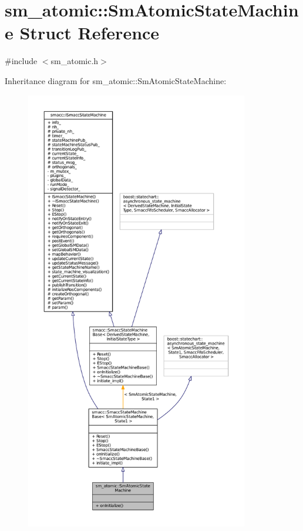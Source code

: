\hypertarget{structsm__atomic_1_1SmAtomicStateMachine}{}\section{sm\+\_\+atomic\+:\+:Sm\+Atomic\+State\+Machine Struct Reference}
\label{structsm__atomic_1_1SmAtomicStateMachine}


{\ttfamily \#include $<$sm\+\_\+atomic.\+h$>$}



Inheritance diagram for sm\+\_\+atomic\+:\+:Sm\+Atomic\+State\+Machine\+:
\nopagebreak
\begin{figure}[H]
\begin{center}
\leavevmode
\includegraphics[height=550pt]{structsm__atomic_1_1SmAtomicStateMachine__inherit__graph}
\end{center}
\end{figure}



